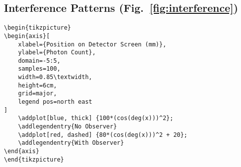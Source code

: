 \documentclass[12pt]{IEEEtran}
\begin{document}
\subsection{Interference Patterns (Fig.~\ref{fig:interference})}
\begin{verbatim}
\begin{tikzpicture}
\begin{axis}[
    xlabel={Position on Detector Screen (mm)},
    ylabel={Photon Count},
    domain=-5:5,
    samples=100,
    width=0.85\textwidth,
    height=6cm,
    grid=major,
    legend pos=north east
]
    \addplot[blue, thick] {100*(cos(deg(x)))^2};
    \addlegendentry{No Observer}
    \addplot[red, dashed] {80*(cos(deg(x)))^2 + 20};
    \addlegendentry{With Observer}
\end{axis}
\end{tikzpicture}
\end{verbatim}
\end{document}
